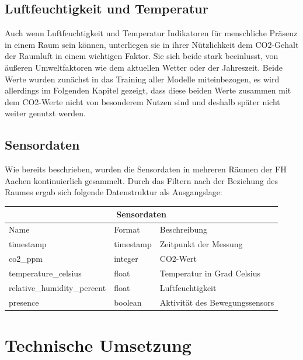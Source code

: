 \section{Luftfeuchtigkeit und Temperatur}
Auch wenn Luftfeuchtigkeit und Temperatur Indikatoren für menschliche Präsenz in einem Raum sein können, 
unterliegen sie in ihrer Nützlichkeit dem CO2-Gehalt der Raumluft in einem wichtigen Faktor. 
Sie sich beide stark beeinlusst, von äußeren Umweltfaktoren wie dem aktuellen Wetter oder der Jahreszeit.
Beide Werte wurden zunächst in das Training aller Modelle miteinbezogen, es wird allerdings im Folgenden 
Kapitel gezeigt, dass diese beiden Werte zusammen mit dem CO2-Werte nicht von besonderem Nutzen sind und 
deshalb später nicht weiter genutzt werden.  

\section{Sensordaten}
Wie bereits beschrieben, wurden die Sensordaten in mehreren Räumen der FH Aachen kontinuierlich 
gesammelt. Durch das Filtern nach der Beziehung des Raumes ergab sich folgende Datenstruktur als
Ausgangslage:\\

\begin{tabular}{|p{4.5cm}||p{3cm}|p{7cm}|}
    \hline
    \multicolumn{3}{|c|}{Sensordaten} \\
    \hline
    Name&Format &Beschreibung\\
    \hline
    timestamp&timestamp&Zeitpunkt der Messung\\
    co2\_ppm&integer&CO2-Wert\\
    temperature\_celsius&float&Temperatur in Grad Celsius\\
    relative\_humidity\_percent&float&Luftfeuchtigkeit\\
    presence&boolean&Aktivität des Bewegungssensors\\
    \hline
\end{tabular}     

\chapter{Technische Umsetzung}

